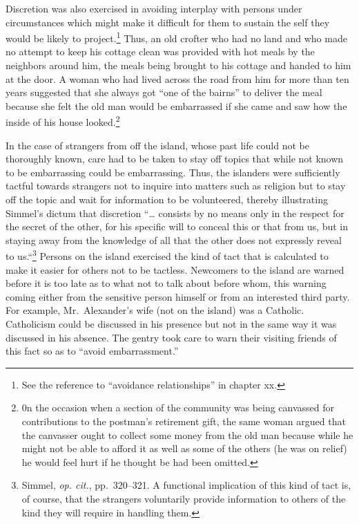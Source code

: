 \documentclass[openany,nobib]{tufte-book}
\begin{document}
Discretion was also exercised in avoiding interplay with persons under
circumstances which might make it difficult for them to sustain the self
they would be likely to project.\footnote{See the reference to
  ``avoidance relationships'' in chapter xx.} Thus, an old crofter who
had no land and who made no attempt to keep his cottage clean was
provided with hot meals by the neighbors around him, the meals being
brought to his cottage and handed to him at the door. A woman who had
lived across the road from him for more than ten years suggested that
she always got ``one of the bairns'' to deliver the meal because she
felt the old man would be embarrassed if she came and saw how the inside
of his house looked.\footnote{0n the occasion when a section of the
  community was being canvassed for contributions to the postman's
  retirement gift, the same woman argued that the canvasser ought to
  collect some money from the old man because while he might not be able
  to afford it as well as some of the others (he was on relief) he would
  feel hurt if he thought be had been omitted.}

In the case of strangers from off the island, whose past life could not
be thoroughly known, care had to be taken to stay off topics that while
not known to be embarrassing could be embarrassing. Thus, the islanders
were sufficiently tactful towards strangers not to inquire into matters
such as religion but to stay off the topic and wait for information to
be volunteered, thereby illustrating Simmel's dictum that discretion
``\ldots{} consists by no means only in the respect for the secret of
the other, for his specific will to conceal this or that from us, but in
staying away from the knowledge of all that the other does not expressly
reveal to us.``\footnote{Simmel, \emph{op. cit.}, pp.~320--321. A
  functional implication of this kind of tact is, of course, that the
  strangers voluntarily provide information to others of the kind they
  will require in handling them.} Persons on the island exercised the
kind of tact that is calculated to make it easier for others not to be
tactless. Newcomers to the island are warned before it is too late as to
what not to talk about before whom, this warning coming either from the
sensitive person himself or from an interested third party. For example,
Mr.~Alexander's wife (not on the island) was a Catholic. Catholicism
could be discussed in his presence but not in the same way it was
discussed in his absence. The gentry took care to warn their visiting
friends of this fact so as to ``avoid embarrassment.''
\end{document}
